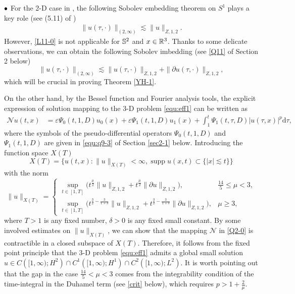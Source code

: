 \documentclass[11pt,twoside]{article}
\newcommand{\p}{\partial}
\newcommand{\ve}{\varepsilon}
\newcommand{\f}{\frac}
\theoremstyle{plain}
\theoremstyle{definition}
\theoremstyle{remark}
\numberwithin{equation}{section}
\begin{document}
${\bf \bullet}$ For the 2-D case in \cite{LY}, the following Sobolev embedding theorem on $S^1$ plays a key role
(see (5.11) of \cite{LY})
\begin{equation}\label{L11-0}
\begin{aligned}
\|u(\tau, \cdot)\|_{(2, \infty)} \lesssim \|u\|_{Z, 1, 2}.
\end{aligned}
\end{equation}
However, \eqref{L11-0} is not applicable for $\Bbb S^2$ and $x\in\Bbb R^3$. Thanks to some delicate observations, we can obtain
the following Sobolev imbedding (see \eqref{Q11} of Section 2 below)
\begin{equation}\label{Q20-0}
\|u(\tau, \cdot)\|_{(2, \infty)}\lesssim\|u(\tau, \cdot)\|_{Z, 1, 2}+\|\p u(\tau, \cdot)\|_{Z, 1, 2},
\end{equation}
which will be crucial in proving Theorem \ref{YH-1}.

On the other hand, by the Bessel function and Fourier analysis tools, the explicit expression of
solution mapping to the 3-D problem \eqref{equ:eff1} can be written as
\begin{equation}\label{Q2-0}
\begin{aligned}
\mathcal{N} u(t, x)&=\ve\Psi_{0}(t, 1, D)u_{0}(x)+\ve\Psi_{1}(t, 1, D) u_{1}(x)
+\int_{1}^{t} \Psi_{1}(t, \tau, D)|u(\tau, x)|^{p} \mathrm{d} \tau,
\end{aligned}
\end{equation}
where the symbols of the pseudo-differential operators $\Psi_{0}(t, 1, D)$ and $\Psi_{1}(t, 1, D)$
are given in \eqref{equ:q9-3} of Section \ref{sec2-1} below.
Introducing the function space $X(T)$
$$
X(T)=\{u(t,x): \|u\|_{X(T)}<\infty, \operatorname{supp} u(x, t)\subset\{|x|\lesssim t\}\}
$$
with the norm
\begin{equation}\label{Q1-0}
\|u\|_{X(T)}=\begin{cases}
\sup _{t \in[1, T]}\big(t^{\f{\mu}{2}}\|u\|_{Z, 1, 2}+t^{\f{\mu}{2}}\|\p u\|_{Z, 1, 2}\big),&\f{14}{5}\leq\mu<3,\\
\sup _{t \in[1, T]}\big(t^{\f32-\f{3}{1+\delta}}\|u\|_{Z, 1, 2}+t^{\f32-\f{3}{1+\delta}}\|\p u\|_{Z, 1, 2}\big),&\mu\geq3,
\end{cases}
\end{equation}
where $T>1$ is any fixed number, $\delta>0$ is any fixed small constant.
By some involved estimates on $\|u\|_{X(T)}$, we can show that the mapping $\mathcal{N}$ in \eqref{Q2-0}
is contractible in a closed subspace of $X(T)$. Therefore, it follows from the fixed point principle that the 3-D
problem \eqref{equ:eff1} admits a global small solution $u\in C\left([1, \infty) ; H^{2}\right) \cap C^{1}\left([1, \infty) ; H^{1}\right)\cap C^{2}\left([1, \infty) ; L^{2}\right)$. It is worth pointing out that the gap in the case
$\f{14}{5}<\mu<3$ comes from the integrability condition of the time-integral in the Duhamel term (see \eqref{crit} below), which requires
$p>1+\f{2}{\mu}$.
\end{document}
